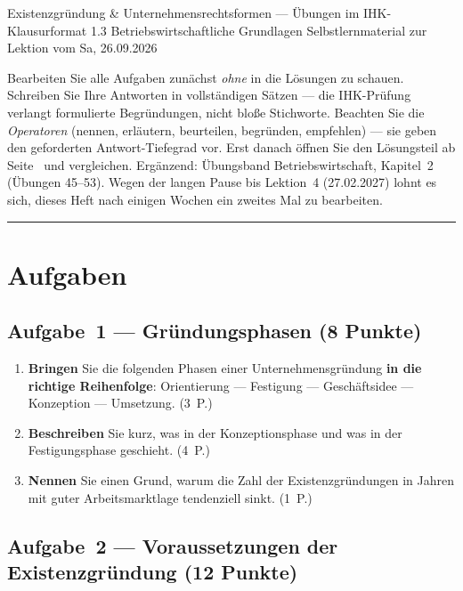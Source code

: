 \documentclass[11pt, a4paper]{article}
\begin{document}
%
  {Existenzgründung \& Unternehmensrechtsformen --- Übungen im IHK-Klausurformat}%
  {1.3 Betriebswirtschaftliche Grundlagen}%
  {Selbstlernmaterial zur Lektion vom Sa, 26.09.2026}


\begin{merksatz}[title={\bfseries So nutzen Sie dieses Aufgabenheft}]
Bearbeiten Sie alle Aufgaben zunächst \emph{ohne} in die Lösungen zu schauen. Schreiben
Sie Ihre Antworten in vollständigen Sätzen --- die IHK-Prüfung verlangt formulierte
Begründungen, nicht bloße Stichworte. Beachten Sie die \emph{Operatoren} (nennen,
erläutern, beurteilen, begründen, empfehlen) --- sie geben den geforderten
Antwort-Tiefegrad vor. Erst danach öffnen Sie den Lösungsteil ab
Seite~\pageref{loesungen} und vergleichen. Ergänzend: Übungsband Betriebswirtschaft,
Kapitel~2 (Übungen 45--53). Wegen der langen Pause bis Lektion~4 (27.02.2027) lohnt es
sich, dieses Heft nach einigen Wochen ein zweites Mal zu bearbeiten.
\end{merksatz}

\tableofcontents
\vspace{1em}
\hrule

\section{Aufgaben}

\subsection*{Aufgabe~1 --- Gründungsphasen (8 Punkte)}

\begin{enumerate}[label=(\alph*)]
  \item \textbf{Bringen} Sie die folgenden Phasen einer Unternehmensgründung \textbf{in
    die richtige Reihenfolge}: Orientierung --- Festigung --- Geschäftsidee ---
    Konzeption --- Umsetzung. \hfill (3~P.)
  \item \textbf{Beschreiben} Sie kurz, was in der Konzeptionsphase und was in der
    Festigungsphase geschieht. \hfill (4~P.)
  \item \textbf{Nennen} Sie einen Grund, warum die Zahl der Existenzgründungen in Jahren
    mit guter Arbeitsmarktlage tendenziell sinkt. \hfill (1~P.)
\end{enumerate}

\subsection*{Aufgabe~2 --- Voraussetzungen der Existenzgründung (12 Punkte)}
\end{document}
